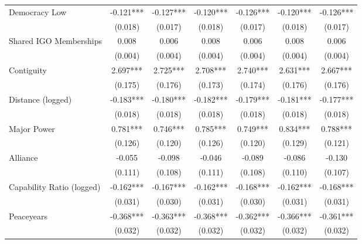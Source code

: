 \documentclass[11pt,fleqn]{article}
\begin{document}
\begin{table}[!h]
\begin{center}
\begin{singlespace}
\begin{tabularx}{7.1in}{lcccccc}
Democracy Low       &      -0.121***&      -0.127***&      -0.120***&      -0.126***&      -0.120***&      -0.126***\\
                    &     (0.018)         &     (0.017)         &     (0.018)         &     (0.017)         &     (0.018)         &     (0.017)         \\

Shared IGO Memberships&       0.008         &       0.006         &       0.008         &       0.006         &       0.008         &       0.006         \\
                    &     (0.004)         &     (0.004)         &     (0.004)         &     (0.004)         &     (0.004)         &     (0.004)         \\

Contiguity          &       2.697***&       2.725***&       2.708***&       2.740***&       2.631***&       2.667***\\
                    &     (0.175)         &     (0.176)         &     (0.173)         &     (0.174)         &     (0.176)         &     (0.176)         \\

Distance (logged)   &      -0.183***&      -0.180***&      -0.182***&      -0.179***&      -0.181***&      -0.177***\\
                    &     (0.018)         &     (0.018)         &     (0.018)         &     (0.018)         &     (0.018)         &     (0.018)         \\

Major Power         &       0.781***&       0.746***&       0.785***&       0.749***&       0.834***&       0.788***\\
                    &     (0.126)         &     (0.120)         &     (0.126)         &     (0.120)         &     (0.129)         &     (0.121)         \\

Alliance            &      -0.055         &      -0.098         &      -0.046         &      -0.089         &      -0.086         &      -0.130         \\
                    &     (0.111)         &     (0.108)         &     (0.111)         &     (0.108)         &     (0.110)         &     (0.107)         \\

Capability Ratio (logged)&      -0.162***&      -0.167***&      -0.162***&      -0.168***&      -0.162***&      -0.168***\\
                    &     (0.031)         &     (0.030)         &     (0.031)         &     (0.030)         &     (0.031)         &     (0.031)         \\
Peaceyears  &      -0.368***&      -0.363***&      -0.368***&      -0.362***&      -0.366***&      -0.361***\\
                    &     (0.032)         &     (0.032)         &     (0.032)         &     (0.032)         &     (0.032)         &     (0.032)             \\


\end{tabularx}
\end{singlespace}
\end{center}
\end{table}
\end{document}
